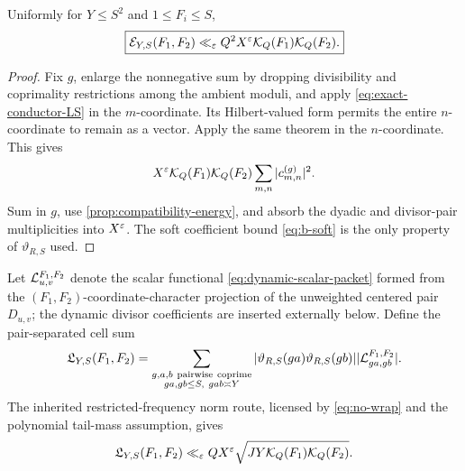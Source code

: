 \begin{theorem}
\label{thm:dynamic-tensor-energy}
Uniformly for \(Y\le S^2\) and \(1\le F_i\le S\),
\begin{equation}
 \boxed{
 \mathcal E_{Y,S}(F_1,F_2)
 \ll_\varepsilon Q^2X^\varepsilon
 \mathcal K_Q(F_1)\mathcal K_Q(F_2).}
 \label{eq:dynamic-tensor-energy}
\end{equation}
\end{theorem}

\begin{proof}
Fix \(g\), enlarge the nonnegative sum by dropping divisibility and
coprimality restrictions among the ambient moduli, and apply
\eqref{eq:exact-conductor-LS} in the \(m\)-coordinate.  Its
Hilbert-valued form permits the entire \(n\)-coordinate to remain as a
vector.  Apply the same theorem in the \(n\)-coordinate.  This gives
\[
 X^\varepsilon\mathcal K_Q(F_1)\mathcal K_Q(F_2)
 \sum_{m,n}|c_{m,n}^{(g)}|^2.
\]
Sum in \(g\), use \cref{prop:compatibility-energy}, and absorb the
dyadic and divisor-pair multiplicities into \(X^\varepsilon\).  The soft
coefficient bound \eqref{eq:b-soft} is the only property of
\(\vartheta_{R,S}\) used.
\end{proof}

Let \(\mathcal L_{u,v}^{F_1,F_2}\) denote the scalar functional
\eqref{eq:dynamic-scalar-packet} formed from the
\((F_1,F_2)\)-coordinate-character projection of the unweighted
centered pair \(D_{u,v}\); the dynamic divisor coefficients are
inserted externally below.  Define the pair-separated cell sum
\begin{equation}
 \mathfrak L_{Y,S}(F_1,F_2)
 =
 \sum_{\substack{g,a,b\ {\rm pairwise\ coprime}\\
                  ga,gb\le S,\ gab\asymp Y}}
 |\vartheta_{R,S}(ga)\vartheta_{R,S}(gb)|
 |\mathcal L_{ga,gb}^{F_1,F_2}|.
 \label{eq:dynamic-cell-definition}
\end{equation}
The inherited restricted-frequency norm route, licensed by
\eqref{eq:no-wrap} and the polynomial tail-mass assumption, gives
\begin{equation}
 \mathfrak L_{Y,S}(F_1,F_2)
 \ll_\varepsilon QX^\varepsilon
 \sqrt{JY\mathcal K_Q(F_1)\mathcal K_Q(F_2)}.
 \label{eq:dynamic-norm-route}
\end{equation}

